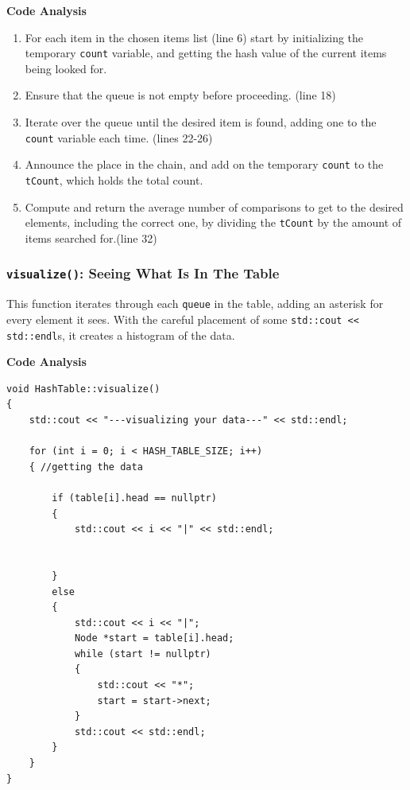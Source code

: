 \documentclass[letterpaper, 10pt]{article}
\begin{document}
\begin{center}
    \textbf{Code Analysis}
\end{center}
\begin{enumerate}
    \item For each item in the chosen items list (line 6) start by initializing the temporary \texttt{count} variable, and getting the hash value of the current items being looked for.
    \item Ensure that the queue is not empty before proceeding. (line 18)
    \item Iterate over the queue until the desired item is found, adding one to the \texttt{count} variable each time. (lines 22-26)
    \item Announce the place in the chain, and add on the temporary \texttt{count} to the \texttt{tCount}, which holds the total count.
    \item Compute and return the average number of comparisons to get to the desired elements, including the correct one, by dividing the \texttt{tCount} by the amount of items searched for.(line 32)
\end{enumerate}



\subsubsection{\texttt{visualize()}: Seeing What Is In The Table }

This function iterates through each \texttt{queue} in the table, adding an asterisk for every element it sees. With the careful placement of some 
\texttt{std::cout << std::endl}s, it creates a histogram of the data.

\begin{center}
    \textbf{Code Analysis}
\end{center}
\begin{addmargin}[-5em]{1em}
\begin{small}
\begin{verbatim}
void HashTable::visualize()
{
	std::cout << "---visualizing your data---" << std::endl;

	for (int i = 0; i < HASH_TABLE_SIZE; i++)
	{ //getting the data

		if (table[i].head == nullptr)
		{
			std::cout << i << "|" << std::endl;

	
		}
		else
		{
			std::cout << i << "|";
			Node *start = table[i].head;
			while (start != nullptr)
			{
				std::cout << "*";
				start = start->next;
			}
			std::cout << std::endl;
		}
	}
}
\end{verbatim}
\end{small}
\end{addmargin}
\end{document}
